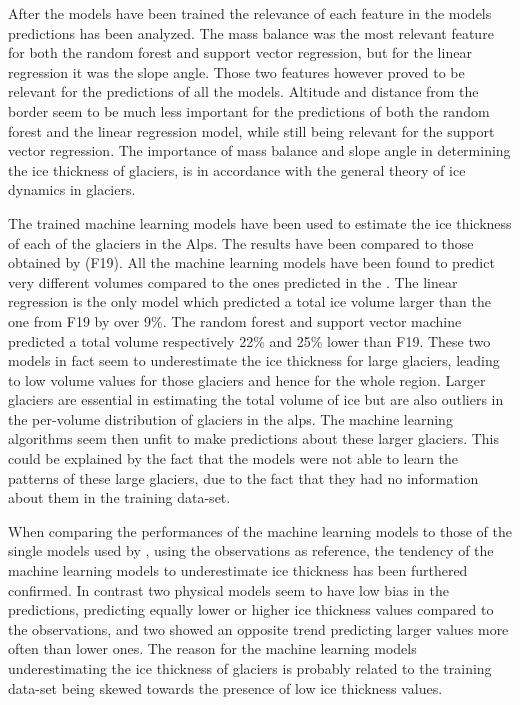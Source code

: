 After the models have been trained the relevance of each feature in the models predictions has been analyzed. The mass balance was the most relevant feature for both the random forest and support vector regression, but for the linear regression it was the slope angle. Those two features however proved to be relevant for the predictions of all the models. Altitude and distance from the border seem to be much less important for the predictions of both the random forest and the linear regression model, while still being relevant for the support vector regression. The importance of mass balance and slope angle in determining the ice thickness of glaciers, is in accordance with the general theory of ice dynamics in glaciers.  

The trained machine learning models have been used to estimate the ice thickness of each of the glaciers in the Alps. The results have been compared to those obtained by \citet{Farinotti2019} (F19). All the machine learning models have been found to predict very different volumes compared to the ones predicted in the \citet{Farinotti2019}. The linear regression is the only model which predicted a total ice volume larger than the one from F19 by over 9\%. The random forest and support vector machine predicted a total volume respectively 22\% and 25\% lower than F19. These two models in fact seem to underestimate the ice thickness for large glaciers, leading to low volume values for those glaciers and hence for the whole region. Larger glaciers are essential in estimating the total volume of ice but are also outliers in the per-volume distribution of glaciers in the alps. The machine learning algorithms seem then unfit to make predictions about these larger glaciers. This could be explained by the fact that the models were not able to learn the patterns of these large glaciers, due to the fact that they had no information about them in the training data-set. 

When comparing the performances of the machine learning models to those of the single models used by \citet{Farinotti2019}, using the observations as reference, the tendency of the machine learning models to underestimate ice thickness has been furthered confirmed. In contrast two physical models seem to have low bias in the predictions, predicting equally lower or higher ice thickness values compared to the observations, and two showed an opposite trend predicting larger values more often than lower ones. The reason for the machine learning models underestimating the ice thickness of glaciers is probably related to the training data-set being skewed towards the presence of low ice thickness values. 

